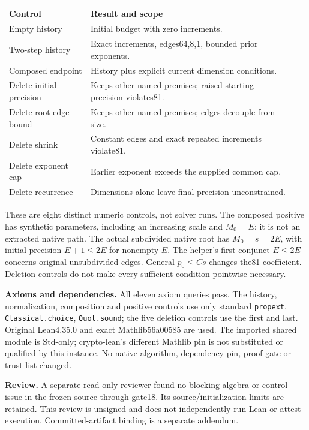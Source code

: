 \documentclass[10pt]{article}
\begin{document}
\begin{tabular}{@{}p{0.27\linewidth}p{0.68\linewidth}@{}}\toprule
Control & Result and scope \\\midrule
Empty history & Initial budget with zero increments.\\
Two-step history & Exact increments, edges64,8,1, bounded prior exponents.\\
Composed endpoint & History plus explicit current dimension conditions.\\
Delete initial precision & Keeps other named premises; raised starting precision violates81.\\
Delete root edge bound & Keeps other named premises; edges decouple from size.\\
Delete shrink & Constant edges and exact repeated increments violate81.\\
Delete exponent cap & Earlier exponent exceeds the supplied common cap.\\
Delete recurrence & Dimensions alone leave final precision unconstrained.\\\bottomrule
\end{tabular}

These are eight distinct numeric controls, not solver runs. The composed positive
has synthetic parameters, including an increasing scale and $M_0=E$; it is not
an extracted native path. The actual subdivided native root has $M_0=s=2E$,
with initial precision $E+1\le2E$ for nonempty $E$. The helper's first
conjunct $E\le2E$ concerns original unsubdivided edges. General $p_0\le Cs$
changes the81 coefficient. Deletion controls do not make every sufficient
condition pointwise necessary.

\textbf{Axioms and dependencies.} All eleven axiom queries pass. The history,
normalization, composition and positive controls use only standard
\texttt{propext}, \texttt{Classical.choice}, \texttt{Quot.sound}; the five
deletion controls use the first and last. Original Lean4.35.0 and exact
Mathlib56a00585 are used. The imported shared module is Std-only; crypto-lean's
different Mathlib pin is not substituted or qualified by this instance.
No native algorithm, dependency pin, proof gate or trust list changed.

\textbf{Review.} A separate read-only reviewer found no blocking algebra or
control issue in the frozen source through gate18. Its source/initialization
limits are retained. This review is unsigned and does not independently run
Lean or attest execution. Committed-artifact binding is a separate addendum.
\end{document}
